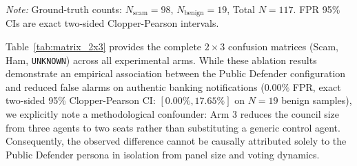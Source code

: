 \documentclass[journal]{IEEEtran}
\begin{document}
\begin{table}[t]
\centering
\caption{Comprehensive $2 \times 3$ Confusion Matrices and Verdict Accounting Across Council Configurations ($N=117$ Hard Challenge Suite)}
\label{tab:matrix_2x3}
\par\vspace{6pt}
\parbox{\columnwidth}{\footnotesize \textit{Note:} Ground-truth counts: $N_{\text{scam}} = 98$, $N_{\text{benign}} = 19$, Total $N=117$. FPR 95\% CIs are exact two-sided Clopper-Pearson intervals.}
\end{table}

Table~\ref{tab:matrix_2x3} provides the complete $2 \times 3$ confusion matrices (Scam, Ham, \texttt{UNKNOWN}) across all experimental arms. While these ablation results demonstrate an empirical association between the Public Defender configuration and reduced false alarms on authentic banking notifications ($0.00\%$ FPR, exact two-sided 95\% Clopper-Pearson CI: $[0.00\%, 17.65\%]$ on $N=19$ benign samples), we explicitly note a methodological confounder: Arm 3 reduces the council size from three agents to two seats rather than substituting a generic control agent. Consequently, the observed difference cannot be causally attributed solely to the Public Defender persona in isolation from panel size and voting dynamics.
\end{document}
